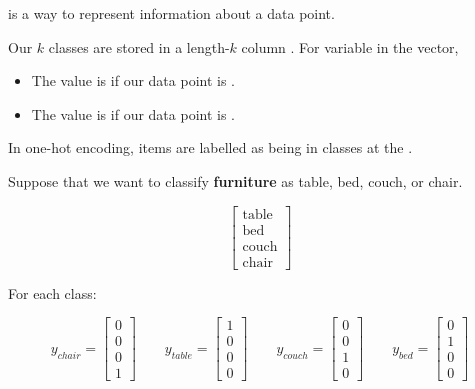         \begin{definition}
             is a way to represent  information about a data point.
            
            Our $k$ classes are stored in a length-$k$ column . For  variable in the vector, 
            
            \begin{itemize}
                \item The value is  if our data point is .
                \item The value is  if our data point is .
            \end{itemize}
            
            In one-hot encoding, items are  labelled as being in  classes at the .
        \end{definition}
        
        \miniex Suppose that we want to classify \textbf{furniture} as table, bed, couch, or chair.
        
        \begin{equation}
            \begin{bmatrix}
              \text{table} \\ \text{bed} \\ \text{couch} \\ \text{chair} 
            \end{bmatrix}
        \end{equation}
        
        For each class:
        
        \begin{equation}
            y_{chair} = 
            \begin{bmatrix}
              0\\0\\0\\1
            \end{bmatrix}
            \qquad
            y_{table} = 
            \begin{bmatrix}
              1\\0\\0\\0
            \end{bmatrix}
            \qquad
            y_{couch} = 
            \begin{bmatrix}
              0\\0\\1\\0
            \end{bmatrix}
            \qquad
            y_{bed} = 
            \begin{bmatrix}
              0\\1\\0\\0
            \end{bmatrix}
        \end{equation}
        

